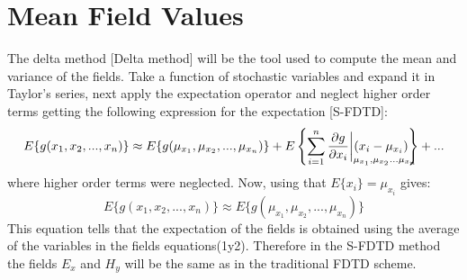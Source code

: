 \documentclass[12pt, oneside]{book}
\begin{document}
\section{Mean Field Values}
The delta method [Delta method] will be the tool used to compute the mean and variance of the fields. Take a function of stochastic variables and expand it in Taylor's series, next apply the expectation operator and neglect higher order terms getting the following expression for the expectation [S-FDTD]:
\begin{equation}
E\lbrace g(x_1,x_2,...,x_n)\rbrace \approx E\lbrace g(\mu_{x_1},\mu_{x_2},...,\mu_{x_n})\rbrace + E \left\lbrace \sum_{i=1}^n \frac{\partial g}{\partial x_i}\bigg |_{\mathrlap{\mu_{x_1},\mu_{x_2}...\mu_{x_n}}}(x_i-\mu_{x_i}) \right\rbrace + ...
\end{equation}
where higher order terms were neglected. Now, using that $E\lbrace x_i\rbrace =\mu_{x_i}$ gives:
\begin{equation}
E\lbrace g(x_1,x_2,...,x_n)\rbrace \approx E\lbrace g(\mu_{x_1},\mu_{x_2},...,\mu_{x_n})\rbrace
\end{equation}
This equation tells that the expectation of the fields is obtained using the average of the variables in the fields equations(1y2). Therefore in the S-FDTD method the fields $E_x$ and $H_y$ will be the same as in the traditional FDTD scheme.
\end{document}
